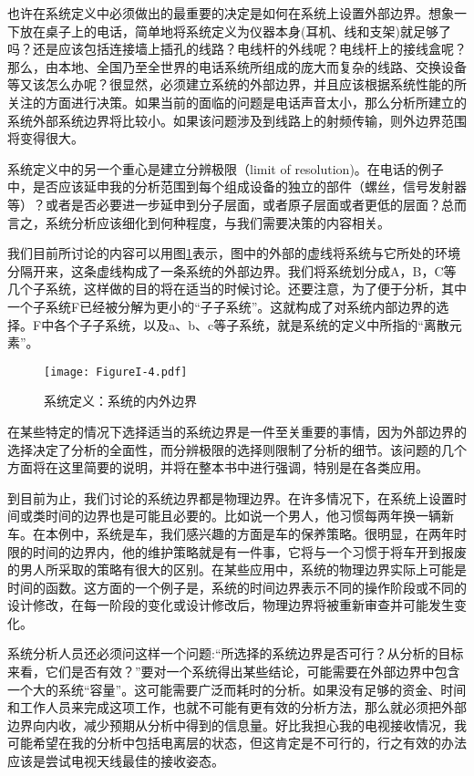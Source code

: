 \documentclass[cn,11pt,chinese]{elegantbook}
\begin{document}
也许在系统定义中必须做出的最重要的决定是如何在系统上设置外部边界。想象一下放在桌子上的电话，简单地将系统定义为仪器本身(耳机、线和支架)就足够了吗？还是应该包括连接墙上插孔的线路？电线杆的外线呢？电线杆上的接线盒呢？那么，由本地、全国乃至全世界的电话系统所组成的庞大而复杂的线路、交换设备等又该怎么办呢？很显然，必须建立系统的外部边界，并且应该根据系统性能的所关注的方面进行决策。如果当前的面临的问题是电话声音太小，那么分析所建立的系统外部系统边界将比较小。如果该问题涉及到线路上的射频传输，则外边界范围将变得很大。

系统定义中的另一个重心是建立分辨极限（limit of resolution)。在电话的例子中，是否应该延申我的分析范围到每个组成设备的独立的部件（螺丝，信号发射器等）？或者是否必要进一步延申到分子层面，或者原子层面或者更低的层面？总而言之，系统分析应该细化到何种程度，与我们需要决策的内容相关。

我们目前所讨论的内容可以用图\ref{fig: fig1_4}表示，图中的外部的虚线将系统与它所处的环境分隔开来，这条虚线构成了一条系统的外部边界。我们将系统划分成A，B，C等几个子系统，这样做的目的将在适当的时候讨论。还要注意，为了便于分析，其中一个子系统F已经被分解为更小的“子子系统”。这就构成了对系统内部边界的选择。F中各个子子系统，以及a、b、c等子系统，就是系统的定义中所指的“离散元素”。

\begin{figure}[htpb]
	\centering
	\texttt{[image: FigureI-4.pdf]}
	\caption{系统定义：系统的内外边界}\label{fig: fig1_4}
\end{figure}

在某些特定的情况下选择适当的系统边界是一件至关重要的事情，因为外部边界的选择决定了分析的全面性，而分辨极限的选择则限制了分析的细节。该问题的几个方面将在这里简要的说明，并将在整本书中进行强调，特别是在各类应用。

到目前为止，我们讨论的系统边界都是物理边界。在许多情况下，在系统上设置时间或类时间的边界也是可能且必要的。比如说一个男人，他习惯每两年换一辆新车。在本例中，系统是车，我们感兴趣的方面是车的保养策略。很明显，在两年时限的时间的边界内，他的维护策略就是有一件事，它将与一个习惯于将车开到报废的男人所采取的策略有很大的区别。在某些应用中，系统的物理边界实际上可能是时间的函数。这方面的一个例子是，系统的时间边界表示不同的操作阶段或不同的设计修改，在每一阶段的变化或设计修改后，物理边界将被重新审查并可能发生变化。

系统分析人员还必须问这样一个问题:“所选择的系统边界是否可行？从分析的目标来看，它们是否有效？”要对一个系统得出某些结论，可能需要在外部边界中包含一个大的系统“容量”。这可能需要广泛而耗时的分析。如果没有足够的资金、时间和工作人员来完成这项工作，也就不可能有更有效的分析方法，那么就必须把外部边界向内收，减少预期从分析中得到的信息量。好比我担心我的电视接收情况，我可能希望在我的分析中包括电离层的状态，但这肯定是不可行的，行之有效的办法应该是尝试电视天线最佳的接收姿态。
\end{document}
